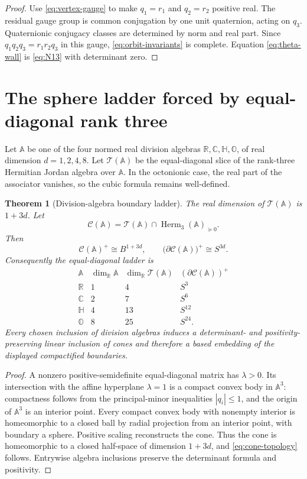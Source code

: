 \documentclass[11pt]{article}
\newtheorem{theorem}{Theorem}[section]
\theoremstyle{definition}
\theoremstyle{remark}
\newcommand{\R}{\mathbb R}
\newcommand{\C}{\mathbb C}
\newcommand{\Hh}{\mathbb H}
\newcommand{\Oo}{\mathbb O}
\newcommand{\Herm}{\operatorname{Herm}}
\newcommand{\cT}{\mathcal T}
\newcommand{\cC}{\mathcal C}
\begin{document}
\begin{proof}
Use \eqref{eq:vertex-gauge} to make $q_1=r_1$ and $q_2=r_2$ positive real.  The residual gauge group is common conjugation by one unit quaternion, acting on $q_3$.  Quaternionic conjugacy classes are determined by norm and real part.  Since
$q_1q_2q_3=r_1r_2q_3$ in this gauge, \eqref{eq:orbit-invariants} is complete.  Equation \eqref{eq:theta-wall} is \eqref{eq:N13} with determinant zero.
\end{proof}

\section{The sphere ladder forced by equal-diagonal rank three}

Let $\mathbb A$ be one of the four normed real division algebras
$\R,\C,\Hh,\Oo$, of real dimension $d=1,2,4,8$.  Let $\cT(\mathbb A)$ be the equal-diagonal slice of the rank-three Hermitian Jordan algebra over $\mathbb A$.  In the octonionic case, the real part of the associator vanishes, so the cubic formula remains well-defined.

\begin{theorem}[Division-algebra boundary ladder]\label{thm:sphere-ladder}
The real dimension of $\cT(\mathbb A)$ is $1+3d$.  Let
\[
 \cC(\mathbb A)=\cT(\mathbb A)\cap\Herm_3(\mathbb A)_{\succeq0}.
\]
Then
\begin{equation}\label{eq:cone-topology}
 \cC(\mathbb A)^+\cong B^{1+3d},
 \qquad
 \bigl(\partial\cC(\mathbb A)\bigr)^+\cong S^{3d}.
\end{equation}
Consequently the equal-diagonal ladder is
\begin{equation}\label{eq:sphere-table}
\begin{array}{c|c|c|c}
\mathbb A&\dim_{\R}\mathbb A&\dim_{\R}\cT(\mathbb A)&
(\partial\cC(\mathbb A))^+\\ \hline
\R&1&4&S^3\\
\C&2&7&S^6\\
\Hh&4&13&S^{12}\\
\Oo&8&25&S^{24}.
\end{array}
\end{equation}
Every chosen inclusion of division algebras induces a determinant- and positivity-preserving linear inclusion of cones and therefore a based embedding of the displayed compactified boundaries.
\end{theorem}

\begin{proof}
A nonzero positive-semidefinite equal-diagonal matrix has $\lambda>0$.  Its intersection with the affine hyperplane $\lambda=1$ is a compact convex body in $\mathbb A^3$: compactness follows from the principal-minor inequalities $|q_i|\leq1$, and the origin of $\mathbb A^3$ is an interior point.  Every compact convex body with nonempty interior is homeomorphic to a closed ball by radial projection from an interior point, with boundary a sphere.  Positive scaling reconstructs the cone.  Thus the cone is homeomorphic to a closed half-space of dimension $1+3d$, and \eqref{eq:cone-topology} follows.  Entrywise algebra inclusions preserve the determinant formula and positivity.
\end{proof}
\end{document}
